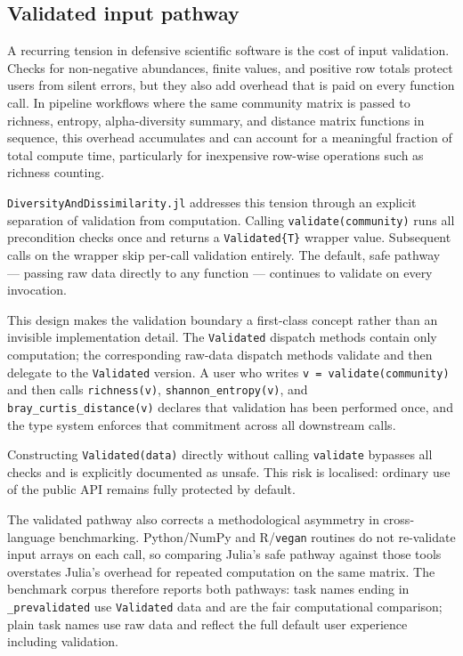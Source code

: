 \documentclass[preprint,12pt,authoryear]{elsarticle}
\begin{document}
\subsection{Validated input pathway}

A recurring tension in defensive scientific software is the cost of input
validation.  Checks for non-negative abundances, finite values, and positive
row totals protect users from silent errors, but they also add overhead that is
paid on every function call.  In pipeline workflows where the same community
matrix is passed to richness, entropy, alpha-diversity summary, and distance
matrix functions in sequence, this overhead accumulates and can account for a
meaningful fraction of total compute time, particularly for inexpensive
row-wise operations such as richness counting.

\texttt{DiversityAndDissimilarity.jl} addresses this tension through an
explicit separation of validation from computation.  Calling
\texttt{validate(community)} runs all precondition checks once and returns a
\texttt{Validated\{T\}} wrapper value.  Subsequent calls on the wrapper skip
per-call validation entirely.  The default, safe pathway --- passing raw data
directly to any function --- continues to validate on every invocation.

This design makes the validation boundary a first-class concept rather than an
invisible implementation detail.  The \texttt{Validated} dispatch methods
contain only computation; the corresponding raw-data dispatch methods validate
and then delegate to the \texttt{Validated} version.  A user who writes
\texttt{v = validate(community)} and then calls \texttt{richness(v)},
\texttt{shannon\_entropy(v)}, and \texttt{bray\_curtis\_distance(v)} declares
that validation has been performed once, and the type system enforces that
commitment across all downstream calls.

Constructing \texttt{Validated(data)} directly without calling
\texttt{validate} bypasses all checks and is explicitly documented as unsafe.
This risk is localised: ordinary use of the public API remains fully protected
by default.

The validated pathway also corrects a methodological asymmetry in cross-language
benchmarking.  Python/NumPy and R/\texttt{vegan} routines do not re-validate
input arrays on each call, so comparing Julia's safe pathway against those
tools overstates Julia's overhead for repeated computation on the same matrix.
The benchmark corpus therefore reports both pathways: task names ending in
\texttt{\_prevalidated} use \texttt{Validated} data and are the fair
computational comparison; plain task names use raw data and reflect the full
default user experience including validation.
\end{document}
